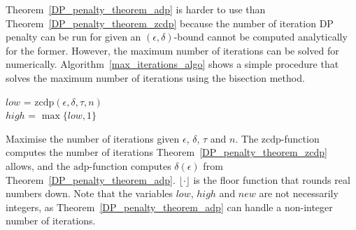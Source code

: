 \documentclass[english,twoside,openright]{HYgraduMLDS}
\begin{document}

Theorem~\ref{DP_penalty_theorem_adp} is harder to use than 
Theorem~\ref{DP_penalty_theorem_zcdp} because the number of iteration 
DP penalty can be run for given an \((\epsilon, \delta)\)-bound cannot be 
computed analytically for the former. However, the maximum number of iterations 
can be solved for numerically. Algorithm~\ref{max_iterations_algo} shows a simple
procedure that solves the maximum number of iterations using the bisection
method.

\begin{algorithm}[H]\label{max_iterations_algo}
  \SetAlgoLined
	\(low\) = \(\mathrm{zcdp}(\epsilon, \delta, \tau, n)\) \\
  \(high\) = \(\max \{low, 1\}\) \\


  \caption{
    Maximise the number of iterations given \(\epsilon\), \(\delta\),
    \(\tau\) and \(n\). The
    \(\mathrm{zcdp}\)-function computes the number of iterations
    Theorem~\ref{DP_penalty_theorem_zcdp} allows, and the
    \(\mathrm{adp}\)-function computes \(\delta(\epsilon)\) from
    Theorem~\ref{DP_penalty_theorem_adp}. \(\lfloor \cdot \rfloor\) is the
    floor function that rounds real numbers down. Note that the variables
    \(low\), \(high\) and \(new\) are not necessarily integers, as
    Theorem~\ref{DP_penalty_theorem_adp} can handle a non-integer number of
    iterations.
  }
\end{algorithm}
\end{document}
